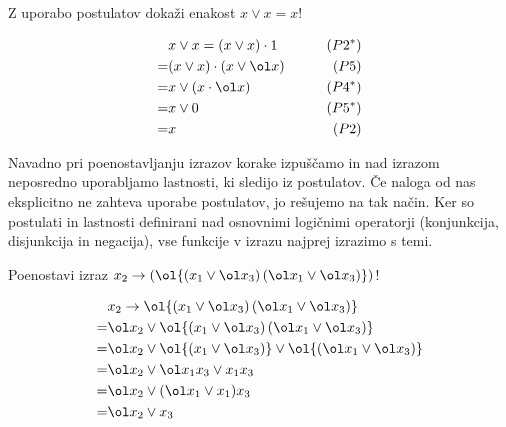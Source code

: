 \begin{zgled}
Z uporabo postulatov dokaži enakost $x \vee x = x$!
\end{zgled}

\begin{resitev}
\begin{align*}
& x \vee x = (x \vee x) \cdot 1  & \qquad (P2^*) \\
 = & (x \vee x) \cdot (x \vee \ol x) & \qquad (P5) \\
 = & x \vee (x \cdot \ol x)& \qquad (P4^*) \\
 = & x \vee 0 & \qquad (P5^*) \\
 = & x\qquad & (P2)
\end{align*}
\end{resitev}

Navadno pri poenostavljanju izrazov korake izpuščamo in nad izrazom neposredno uporabljamo lastnosti, ki sledijo iz postulatov. Če naloga od nas eksplicitno ne zahteva uporabe postulatov, jo rešujemo na tak način. Ker so postulati in lastnosti definirani nad osnovnimi logičnimi operatorji (konjunkcija, disjunkcija in negacija), vse funkcije v izrazu najprej izrazimo s temi.

\begin{zgled}
Poenostavi izraz $x_2 \rightarrow \left( \ol{\left( x_1 \vee \ol x_3 \right) \left( \ol x_1 \vee \ol x_3\right)}\right)$!
\end{zgled}
\begin{resitev}
\begin{align*}
&  x_2 \rightarrow \ol{\left( x_1 \vee \ol x_3 \right) \left( \ol x_1 \vee \ol x_3\right)}\\
 = & \ol x_2 \vee \ol{\left( x_1 \vee \ol x_3 \right) \left( \ol x_1 \vee \ol x_3\right)}\\
 = & \ol x_2 \vee \ol{\left( x_1 \vee \ol x_3 \right)} \vee \ol{\left( \ol x_1 \vee \ol x_3\right)}\\
 = & \ol x_2 \vee \ol x_1 x_3 \vee x_1 x_3\\
 = & \ol x_2 \vee (\ol x_1 \vee x_1) x_3\\
 = & \ol x_2 \vee x_3
\end{align*}
\end{resitev}





